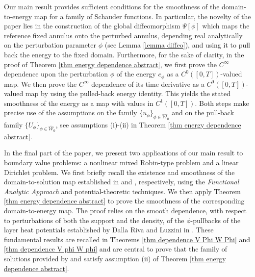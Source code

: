 \documentclass[11pt,reqno,a4paper]{amsart}
\theoremstyle{plain}
\theoremstyle{definition}
\begin{document}
Our main result provides sufficient conditions for the smoothness of the domain-to-energy map for a family of Schauder functions. In particular, the novelty of the paper lies in the construction of the global diffeomorphism $\Psi[\phi]$ which maps the reference fixed annulus onto the perturbed
annulus, depending real analytically on the perturbation parameter $\phi$ (see Lemma \ref{lemma diffeo}), and using it to pull back the energy to the fixed domain. Furthermore, for the sake of clarity, in the proof of Theorem \ref{thm energy dependence abstract}, we first prove the $C^\infty$ dependence upon the perturbation $\phi$ of the energy $e_\phi$ as a $C^0([0,T])$-valued map. We then prove the $C^\infty$ dependence of its time derivative as a $C^0([0,T])$-valued map by using the pulled-back energy identity. This yields the stated smoothness of the energy as a map with values in $C^1([0,T])$. Both steps make precise use of the assumptions on the family $\{ u_\phi \}_{\phi \in \widehat{\mathcal{W}}_0}$ and on the pull-back family $\{ U_\phi \}_{\phi \in \widehat{\mathcal{W}}_0}$, see assumptions (i)-(ii) in Theorem \ref{thm energy dependence abstract}.

In the final part of the paper, we present two applications of our main result to boundary value problems: a nonlinear mixed Robin-type problem and a linear Dirichlet problem. We first briefly recall the existence and smoothness of the domain-to-solution map established in \cite{DaLuMoMu24.2} and \cite{DaLuMu25}, respectively, using the \textit{Functional Analytic Approach} and potential-theoretic techniques. We then apply Theorem \ref{thm energy dependence abstract} to prove the smoothness of the corresponding domain-to-energy map. The proof relies on the smooth dependence, with respect to perturbations of both the support and the density, of the $\phi$-pullbacks of the layer heat potentials established by Dalla Riva and Luzzini in \cite{DaLu23}. These fundamental results are recalled in Theorems \ref{thm dependence V Phi W Phi} and \ref{thm dependence V phi W phi} and are central to prove that the family of solutions provided by \cite{DaLuMoMu24.2} and \cite{DaLuMu25} satisfy assumption (ii) of Theorem \ref{thm energy dependence abstract}.
\end{document}
